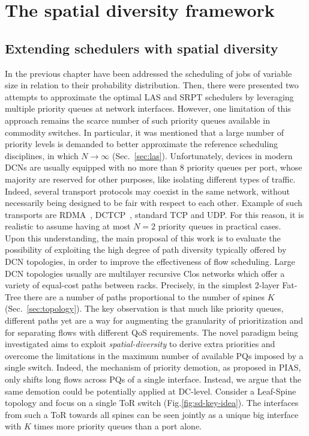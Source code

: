 \chapter{The spatial diversity framework}
\label{ch:sdframework}
\section{Extending schedulers with spatial diversity}

In the previous chapter have been addressed the scheduling of jobs of variable size in relation to their probability distribution. Then, there were presented two attempts to approximate the optimal LAS and SRPT schedulers by leveraging multiple priority queues at network interfaces. However, one limitation of this approach remains the scarce number of such priority queues available in commodity switches. In particular, it was mentioned that a large number of priority levels is demanded to better approximate the reference scheduling disciplines, in which $N \rightarrow \infty$ (Sec.~\ref{sec:las}). Unfortunately, devices in modern DCNs are usually equipped with no more than 8 priority queues per port, whose majority are reserved for other purposes, like isolating different types of traffic. Indeed, several transport protocols may coexist in the same network, without necessarily being designed to be fair with respect to each other. Example of such transports are RDMA~\cite{rdma}, DCTCP~\cite{dctcp}, standard TCP and UDP. For this reason, it is realistic to assume having at most $N=2$ priority queues in practical cases. \\
Upon this understanding, the main proposal of this work is to evaluate the possibility of exploiting the high degree of path diversity typically offered by DCN topologies, in order to improve the effectiveness of flow scheduling. Large DCN topologies usually are multilayer recursive Clos networks which offer a variety of equal-cost paths between racks. Precisely, in the simplest 2-layer Fat-Tree there are a number of paths proportional to the number of spines $K$ (Sec.~\ref{sec:topology}). The key observation is that much like priority queues, different paths yet are a way for augmenting the granularity of prioritization and for separating flows with different QoS requirements. The novel paradigm being investigated aims to exploit \emph{spatial-diversity} to derive extra priorities and overcome the limitations in the maximum number of available PQs imposed by a single switch. Indeed, the mechanism of priority demotion, as proposed in PIAS, only shifts long flows across PQs of a single interface. Instead, we argue that the same demotion could be potentially applied at DC-level. Consider a Leaf-Spine topology and focus on a single ToR switch (Fig.\ref{fig:sd-key-idea}). The interfaces from such a ToR towards all spines can be seen jointly as a unique big interface with $K$ times more priority queues than a port alone.
